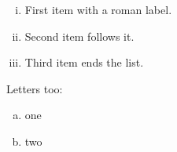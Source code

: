 \documentclass{article}
\begin{document}
\begin{enumerate}[(i)]
\item First item with a roman label.
\item Second item follows it.
\item Third item ends the list.
\end{enumerate}
Letters too: \begin{enumerate}[a)]\item one \item two\end{enumerate}
\end{document}
